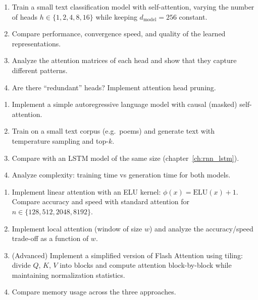 \begin{exercise}
\begin{enumerate}
  \item Train a small text classification model with self-attention, varying
    the number of heads $h \in \{1, 2, 4, 8, 16\}$ while keeping
    $d_{\text{model}} = 256$ constant.
  \item Compare performance, convergence speed, and quality of the learned
    representations.
  \item Analyze the attention matrices of each head and show that they
    capture different patterns.
  \item Are there ``redundant'' heads? Implement attention head pruning.
\end{enumerate}
\end{exercise}

\begin{exercise}
\begin{enumerate}
  \item Implement a simple autoregressive language model with causal
    (masked) self-attention.
  \item Train on a small text corpus (e.g.\ poems) and generate text with
    temperature sampling and top-$k$.
  \item Compare with an LSTM model of the same size
    (chapter~\ref{ch:rnn_lstm}).
  \item Analyze complexity: training time vs generation time for both
    models.
\end{enumerate}
\end{exercise}

\begin{exercise}
\begin{enumerate}
  \item Implement linear attention with an ELU kernel:
    $\phi(x) = \text{ELU}(x) + 1$. Compare accuracy and speed with
    standard attention for $n \in \{128, 512, 2048, 8192\}$.
  \item Implement local attention (window of size $w$) and analyze the
    accuracy/speed trade-off as a function of $w$.
  \item (Advanced) Implement a simplified version of Flash Attention using
    tiling: divide $Q$, $K$, $V$ into blocks and compute attention
    block-by-block while maintaining normalization statistics.
  \item Compare memory usage across the three approaches.
\end{enumerate}
\end{exercise}
